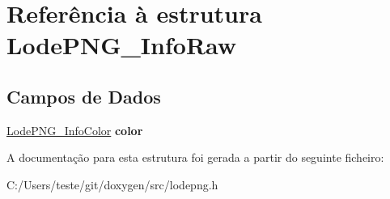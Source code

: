 \hypertarget{struct_lode_p_n_g___info_raw}{\section{Referência à estrutura Lode\-P\-N\-G\-\_\-\-Info\-Raw}
\label{struct_lode_p_n_g___info_raw}
}
\subsection*{Campos de Dados}
\begin{DoxyCompactItemize}
\item 
\hypertarget{struct_lode_p_n_g___info_raw_aacf3bf4b386d02634eee23d7bf75bc5d}{\hyperlink{struct_lode_p_n_g___info_color}{Lode\-P\-N\-G\-\_\-\-Info\-Color} {\bfseries color}}\label{struct_lode_p_n_g___info_raw_aacf3bf4b386d02634eee23d7bf75bc5d}

\end{DoxyCompactItemize}


A documentação para esta estrutura foi gerada a partir do seguinte ficheiro\-:\begin{DoxyCompactItemize}
\item 
C\-:/\-Users/teste/git/doxygen/src/lodepng.\-h\end{DoxyCompactItemize}
